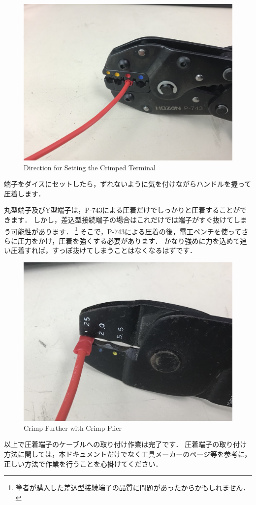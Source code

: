 \documentclass[{../../master}]{subfiles}
\begin{document}
\begin{figure}[ht]
  \centering
  \includegraphics[height=50truemm]{images/direction_for_setting_the_crimped_terminal.jpg}
  \caption{Direction for Setting the Crimped Terminal}
  \label{fig:direction_for_setting_the_crimped_terminal}
\end{figure}

端子をダイスにセットしたら，ずれないように気を付けながらハンドルを握って圧着します．

丸型端子及びY型端子は，P-743による圧着だけでしっかりと圧着することができます．
しかし，差込型接続端子の場合はこれだけでは端子がすぐ抜けてしまう可能性があります．
\footnote{筆者が購入した差込型接続端子の品質に問題があったからかもしれません．}
そこで，P-743による圧着の後，電工ペンチを使ってさらに圧力をかけ，圧着を強くする必要があります．
かなり強めに力を込めて追い圧着すれば，すっぽ抜けてしまうことはなくなるはずです．

\begin{figure}[ht]
  \centering
  \includegraphics[height=50truemm]{images/crimp_further_with_crimp_plier.jpg}
  \caption{Crimp Further with Crimp Plier}
  \label{fig:crimp_further_with_crimp_plier}
\end{figure}

以上で圧着端子のケーブルへの取り付け作業は完了です．
圧着端子の取り付け方法に関しては，本ドキュメントだけでなく工具メーカーのページ等を参考に，正しい方法で作業を行うことを心掛けてください．
\end{document}
